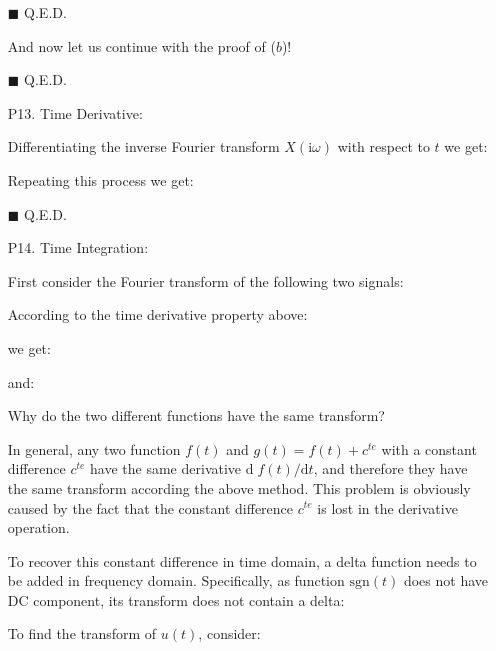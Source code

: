 \begin{itemize}
	\begin{dem}
	
	\begin{flushright}
		$\blacksquare$  Q.E.D.
	\end{flushright}
	\end{dem}
	And now let us continue with the proof of ($b$)!

	\begin{dem}
	
	
	\begin{flushright}
		$\blacksquare$  Q.E.D.
	\end{flushright}
	\end{dem}
	
	\item[P13.] Time Derivative\label{fourier transform time derivative}:
	
	\begin{dem} 
	Differentiating the inverse Fourier transform $X(\mathrm{i}\omega)$ with respect to $t$ we get:
	
	Repeating this process we get:
	
	\begin{flushright}
		$\blacksquare$  Q.E.D.
	\end{flushright}
	\end{dem}
	
	\item[P14.] Time Integration\label{fourier transform time integration}:
	
	First consider the Fourier transform of the following two signals:
	
	
	According to the time derivative property above:
	
	we get:
	
	and:
	
	Why do the two different functions have the same transform?
	
	In general, any two function $f(t)$ and $g(t)=f(t)+c^{te}$ with a constant difference $c^{te}$ have the same derivative $\mathrm{d}\;f(t)/\mathrm{d}t$, and therefore they have the same transform according the above method. This problem is obviously caused by the fact that the constant difference $c^{te}$ is lost in the derivative operation.
	
	To recover this constant difference in time domain, a delta function 
	needs to be added in frequency domain. Specifically, as function $\mathrm{sgn}(t)$ does not have DC component, its transform does not contain a delta:
	
	To find the transform of $u(t)$, consider:
	

\end{itemize}
